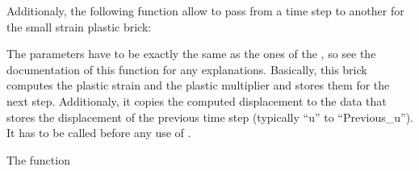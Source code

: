 \documentclass[a4paper,11pt,english]{sphinxmanual}
\begin{document}
Additionaly, the following function allow to pass from a time step to another for the small strain plastic brick:

\begin{sphinxVerbatim}[commandchars=\\\{\}]
     
     
        
\end{sphinxVerbatim}

The parameters have to be exactly the same as the ones of the
,  so see the documentation of
this function for any explanations.
Basically, this brick computes the plastic strain and the plastic
multiplier and stores them for the next step. Additionaly, it copies
the computed displacement to the data that stores the displacement
of the previous time step (typically “u” to “Previous\_u”).
It has to be called before any use of
.

The function

\begin{sphinxVerbatim}[commandchars=\\\{\}]
     
     
     
       
     
\end{sphinxVerbatim}
\end{document}
